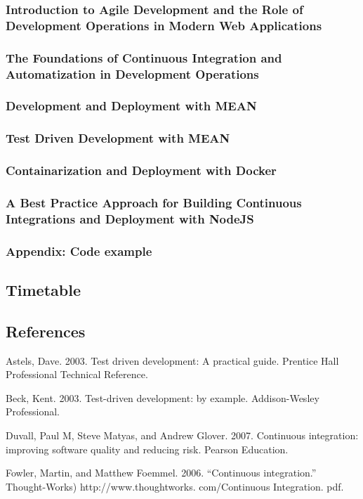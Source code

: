 \subsubsection{Introduction to Agile Development and the Role of Development Operations in Modern Web Applications}
\subsubsection{The Foundations of Continuous Integration and Automatization in Development Operations}
\subsubsection{Development and Deployment with MEAN}
\subsubsection{Test Driven Development with MEAN}
\subsubsection{Containarization and Deployment with Docker}
\subsubsection{A Best Practice Approach for Building Continuous Integrations and Deployment with NodeJS}
\subsubsection{Appendix: Code example}

\subsection{Timetable}

\subsection{References}

Astels, Dave. 2003. Test driven development: A practical guide. Prentice Hall Professional Technical Reference.

Beck, Kent. 2003. Test-driven development: by example. Addison-Wesley Professional.

Duvall, Paul M, Steve Matyas, and Andrew Glover. 2007. Continuous integration: improving software quality and reducing risk. Pearson Education.

Fowler, Martin, and Matthew Foemmel. 2006. “Continuous integration.” Thought-Works) http://www.thoughtworks. com/Continuous Integration. pdf.

